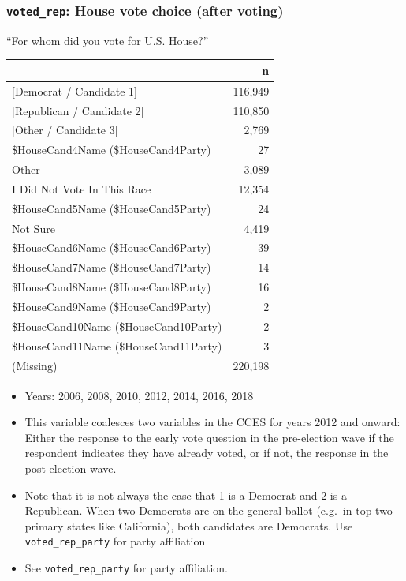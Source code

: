 \documentclass[10pt,article,oneside]{memoir}
\theoremstyle{definition}
\begin{document}
\hypertarget{voted_rep-house-vote-choice-after-voting}{%
\subsubsection{\texorpdfstring{\texttt{voted\_rep}: House vote choice
(after
voting)}{voted\_rep: House vote choice (after voting)}}\label{voted_rep-house-vote-choice-after-voting}}

``For whom did you vote for U.S. House?''

\begin{table}[H]
\centering
\begin{tabular}{lr}
\toprule
 & n\\
\midrule
{[Democrat / Candidate 1]} & 116,949\\
{[Republican / Candidate 2]} & 110,850\\
{[Other / Candidate 3]} & 2,769\\
\$HouseCand4Name (\$HouseCand4Party) & 27\\
Other & 3,089\\
I Did Not Vote In This Race & 12,354\\
\$HouseCand5Name (\$HouseCand5Party) & 24\\
Not Sure & 4,419\\
\$HouseCand6Name (\$HouseCand6Party) & 39\\
\$HouseCand7Name (\$HouseCand7Party) & 14\\
\$HouseCand8Name (\$HouseCand8Party) & 16\\
\$HouseCand9Name (\$HouseCand9Party) & 2\\
\$HouseCand10Name (\$HouseCand10Party) & 2\\
\$HouseCand11Name (\$HouseCand11Party) & 3\\
(Missing) & 220,198\\
\bottomrule
\end{tabular}
\end{table}

\begin{itemize}
\tightlist
\item
  Years: 2006, 2008, 2010, 2012, 2014, 2016, 2018
\item
  This variable coalesces two variables in the CCES for years 2012 and
  onward: Either the response to the early vote question in the
  pre-election wave if the respondent indicates they have already voted,
  or if not, the response in the post-election wave.
\item
  Note that it is not always the case that 1 is a Democrat and 2 is a
  Republican. When two Democrats are on the general ballot (e.g.~in
  top-two primary states like California), both candidates are
  Democrats. Use \texttt{voted\_rep\_party} for party affiliation
\item
  See \texttt{voted\_rep\_party} for party affiliation.
\end{itemize}
\end{document}
